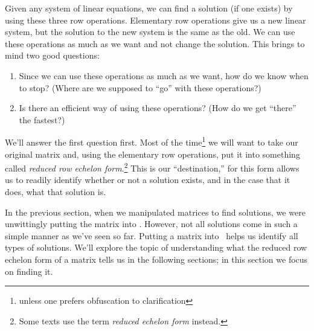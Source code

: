 \smallskip


\smallskip

Given any system of linear equations, we can find a solution (if one exists) by using these three row operations. Elementary row operations give us a new linear system, but the solution to the new system is the same as the old. We can use these operations as much as we want and not change the solution. This brings to mind two good questions:
\begin{enumerate}
\item		Since we can use these operations as much as we want, how do we know when to stop? (Where are we supposed to ``go'' with these operations?)
\item		Is there an efficient way of using these operations? (How do we get ``there'' the fastest?)
\end{enumerate}

We'll answer the first question first. Most of the time\footnote{unless one prefers obfuscation to clarification} we will want to take our original matrix and, using the elementary row operations, put it into something called \textit{reduced row echelon form}.\footnote{Some texts use the term \textit{reduced echelon form} instead.} This is our ``destination,'' for this form allows us to readily identify whether or not a solution exists, and in the case that it does, what that solution is. 

In the previous section, when we manipulated matrices to find solutions, we were unwittingly putting the matrix into \rref. However, not all solutions come in such a simple manner as we've seen so far. Putting a matrix into \rref\ helps us identify all types of solutions. We'll explore the topic of understanding what the reduced row echelon form of a matrix tells us in the following sections; in this section we focus on finding it.

\smallskip

